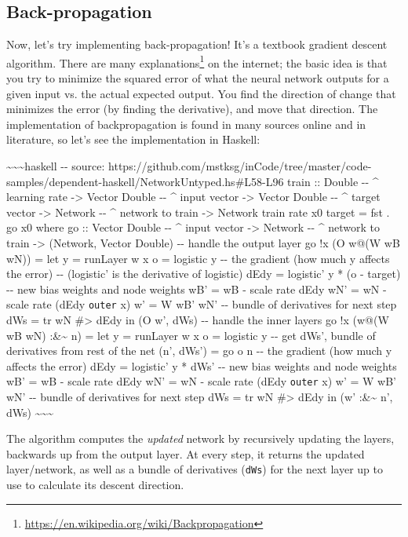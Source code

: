\documentclass[]{article}
\renewcommand{\href}[2]{#2\footnote{\url{#1}}}
\begin{document}
\subsection{Back-propagation}

Now, let's try implementing back-propagation! It's a textbook gradient descent
algorithm. There are \href{https://en.wikipedia.org/wiki/Backpropagation}{many
explanations} on the internet; the basic idea is that you try to minimize the
squared error of what the neural network outputs for a given input vs. the
actual expected output. You find the direction of change that minimizes the
error (by finding the derivative), and move that direction. The implementation
of backpropagation is found in many sources online and in literature, so let's
see the implementation in Haskell:

\textasciitilde{}\textasciitilde{}\textasciitilde{}haskell -\/- source:
https://github.com/mstksg/inCode/tree/master/code-samples/dependent-haskell/NetworkUntyped.hs\#L58-L96
train :: Double -\/- \^{} learning rate -\textgreater{} Vector Double -\/- \^{}
input vector -\textgreater{} Vector Double -\/- \^{} target vector
-\textgreater{} Network -\/- \^{} network to train -\textgreater{} Network train
rate x0 target = fst . go x0 where go :: Vector Double -\/- \^{} input vector
-\textgreater{} Network -\/- \^{} network to train -\textgreater{} (Network,
Vector Double) -\/- handle the output layer go !x (O w@(W wB wN)) = let y =
runLayer w x o = logistic y -\/- the gradient (how much y affects the error)
-\/- (logistic' is the derivative of logistic) dEdy = logistic' y * (o - target)
-\/- new bias weights and node weights wB' = wB - scale rate dEdy wN' = wN -
scale rate (dEdy \texttt{outer} x) w' = W wB' wN' -\/- bundle of derivatives for
next step dWs = tr wN \#\textgreater{} dEdy in (O w', dWs) -\/- handle the inner
layers go !x (w@(W wB wN) :\&\textasciitilde{} n) = let y = runLayer w x o =
logistic y -\/- get dWs', bundle of derivatives from rest of the net (n', dWs')
= go o n -\/- the gradient (how much y affects the error) dEdy = logistic' y *
dWs' -\/- new bias weights and node weights wB' = wB - scale rate dEdy wN' = wN
- scale rate (dEdy \texttt{outer} x) w' = W wB' wN' -\/- bundle of derivatives
for next step dWs = tr wN \#\textgreater{} dEdy in (w' :\&\textasciitilde{} n',
dWs) \textasciitilde{}\textasciitilde{}\textasciitilde{}

The algorithm computes the \emph{updated} network by recursively updating the
layers, backwards up from the output layer. At every step, it returns the
updated layer/network, as well as a bundle of derivatives (\texttt{dWs}) for the
next layer up to use to calculate its descent direction.
\end{document}
